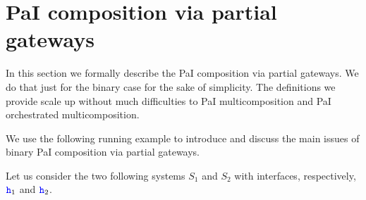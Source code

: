 

\section{PaI composition via partial gateways}

In this section we formally describe the PaI composition via partial gateways.
We do that just for the binary case for the sake of simplicity. 
The definitions we provide scale up without much difficulties to PaI multicomposition 
and PaI orchestrated multicomposition. 

We use the following running example to introduce and discuss the main issues of 
binary PaI composition via partial gateways.

Let us consider the two following systems $S_1$ and $S_2$ with interfaces, respectively,
${\mathtt{\color{blue}{ {h}}}}_1$ and ${\mathtt{\color{blue}{ {h}}}}_2$.
